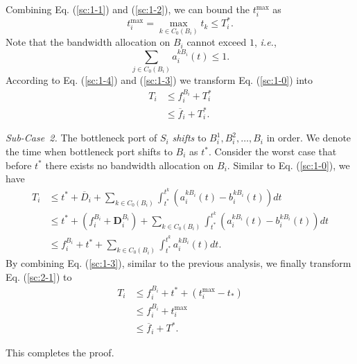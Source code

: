 \documentclass[10pt, conference, letterpaper]{IEEEtran}
\begin{document}
\begin{IEEEproof}
\begin{equation}
\end{equation}
Combining Eq. (\ref{sc:1-1}) and (\ref{sc:1-2}), we can bound the $t_i^{\text{max}}$ as
\begin{equation}\label{sc:1-4}
	t_i^{\text{max}} = \max_{k \in C_0(B_i)} t_k \leq T_i^*.
\end{equation}
Note that the bandwidth allocation on $B_i$ cannot exceed $1$, \emph{i.e.},
\begin{equation}\label{sc:1-3}
	\sum_{j \in C_0(B_i)} a_i^{kB_i}(t) \leq 1.
\end{equation}
According to Eq. (\ref{sc:1-4}) and (\ref{sc:1-3}) we transform Eq. (\ref{sc:1-0}) into
\begin{equation}
	\begin{aligned}
		T_i & \leq f_i^{B_i} + T_i^*\\
		& \leq \overline{f}_i + T_i^*.
	\end{aligned}
\end{equation}

\emph{Sub-Case~2.} The bottleneck port of $S_i$ \emph{shifts} to $B_i^1,B_i^2,\dots,B_i$ in order. We denote the time when bottleneck port shifts to $B_i$ as $t^*$. Consider the worst case that before $t^*$ there exists no bandwidth allocation on $B_i$. Similar to Eq. (\ref{sc:1-0}), we have
\begin{equation}\label{sc:2-1}
	\begin{aligned}
		T_i & \leq t^* + \overline{D}_i + \sum_{k \in C_0(B_i)}\int_{t^*}^{t^k}(a_i^{kB_i}(t)-b_i^{kB_i}(t))dt\\
		& \leq t^* + (f_i^{B_i} + \mathbf{D}_i^{B_i}) + \sum_{k \in C_0(B_i)}\int_{t^*}^{t^k}(a_i^{kB_i}(t)-b_i^{kB_i}(t))dt\\
		& \leq f_i^{B_i} + t^* + \sum_{k \in C_0(B_i)}\int_{t^*}^{t^k} a_i^{kB_i}(t)dt.
	\end{aligned}
\end{equation}
By combining Eq. (\ref{sc:1-3}), similar to the previous analysis, we finally transform Eq. (\ref{sc:2-1}) to
\begin{equation}
	\begin{aligned}
		T_i & \leq f_i^{B_i} + t^* + (t_i^{\text{max}} - t_*)\\
		& \leq f_i^{B_i} + t_i^{\text{max}}\\
		& \leq \overline{f}_i + T^*.
	\end{aligned}
\end{equation}

This completes the proof.
\end{IEEEproof}
\end{document}
